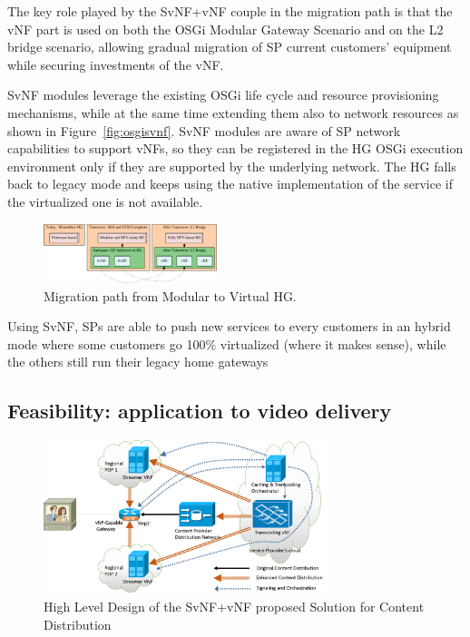 The key role played by the SvNF+vNF couple in the migration path is that the vNF part is used on both the OSGi Modular Gateway Scenario and on the L2 bridge scenario, allowing gradual migration of SP current customers' equipment while securing investments of the vNF. 

SvNF modules leverage the existing OSGi life cycle and resource provisioning mechanisms, while at the same time extending them also to network resources as shown in Figure~\ref{fig:osgisvnf}. SvNF modules are aware of SP network capabilities to support vNFs, so they can be registered in the HG OSGi execution environment only if they are supported by the underlying network.
The HG falls back to legacy mode and keeps using the native implementation of the service if the virtualized one is not available.
\begin{figure}
  \begin{center}
    \includegraphics[width=0.45\textwidth]{fig/migrationPath.pdf}
  \end{center}
  \caption{ Migration path from Modular to Virtual HG.
    \label{fig:migration}
  }
\end{figure}	
Using SvNF, SPs are able to push new services to every customers in an hybrid mode where some customers go 100\% virtualized (where it makes sense), while the others still run their legacy home gateways
 
\subsection{Feasibility: application to video delivery}
\begin{figure}
	\center
	\includegraphics[width=0.75\textwidth]{fig/highleveldesign.png}
	\caption{ High Level Design of the SvNF+vNF proposed Solution for Content Distribution
    \label{fig:hld}
    }
\end{figure}

